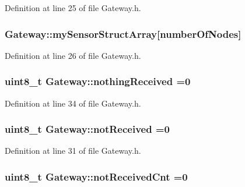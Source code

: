 Definition at line 25 of file Gateway.\+h.

\subsubsection[{\texorpdfstring{my\+Sensor\+Struct\+Array}{mySensorStructArray}}]{ Gateway\+::my\+Sensor\+Struct\+Array\mbox{[}{\bf number\+Of\+Nodes}\mbox{]}\hspace{0.3cm}{\ttfamily [private]}}\hypertarget{class_gateway_ae95c6b223c4c3d759f5594cec3283b69}{}\label{class_gateway_ae95c6b223c4c3d759f5594cec3283b69}


Definition at line 26 of file Gateway.\+h.

\subsubsection[{\texorpdfstring{nothing\+Received}{nothingReceived}}]{\setlength{\rightskip}{0pt plus 5cm}uint8\+\_\+t Gateway\+::nothing\+Received =0\hspace{0.3cm}{\ttfamily [private]}}\hypertarget{class_gateway_aeb1b88db56322530fa14d814b065c512}{}\label{class_gateway_aeb1b88db56322530fa14d814b065c512}


Definition at line 34 of file Gateway.\+h.

\subsubsection[{\texorpdfstring{not\+Received}{notReceived}}]{\setlength{\rightskip}{0pt plus 5cm}uint8\+\_\+t Gateway\+::not\+Received =0\hspace{0.3cm}{\ttfamily [private]}}\hypertarget{class_gateway_a97308149e6ad1ba165624c6eef3df761}{}\label{class_gateway_a97308149e6ad1ba165624c6eef3df761}


Definition at line 31 of file Gateway.\+h.

\subsubsection[{\texorpdfstring{not\+Received\+Cnt}{notReceivedCnt}}]{\setlength{\rightskip}{0pt plus 5cm}uint8\+\_\+t Gateway\+::not\+Received\+Cnt =0\hspace{0.3cm}{\ttfamily [private]}}\hypertarget{class_gateway_ae486953d1dbc8811b3438f64f2e940ec}{}\label{class_gateway_ae486953d1dbc8811b3438f64f2e940ec}


